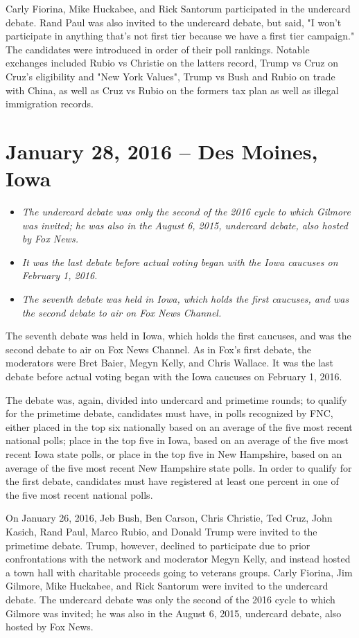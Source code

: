 Carly Fiorina, Mike Huckabee, and Rick Santorum participated in the
undercard debate. Rand Paul was also invited to the undercard debate,
but said, "I won't participate in anything that's not first tier because
we have a first tier campaign." The candidates were introduced in order
of their poll rankings. Notable exchanges included Rubio vs Christie on
the latters record, Trump vs Cruz on Cruz's eligibility and "New York
Values", Trump vs Bush and Rubio on trade with China, as well as Cruz vs
Rubio on the formers tax plan as well as illegal immigration records.

\section{January 28, 2016 -- Des Moines,
Iowa}\label{january-28-2016-des-moines-iowa}

\begin{itemize}
\item
  \emph{The undercard debate was only the second of the 2016 cycle to
  which Gilmore was invited; he was also in the August 6, 2015,
  undercard debate, also hosted by Fox News.}
\item
  \emph{It was the last debate before actual voting began with the Iowa
  caucuses on February 1, 2016.}
\item
  \emph{The seventh debate was held in Iowa, which holds the first
  caucuses, and was the second debate to air on Fox News Channel.}
\end{itemize}

The seventh debate was held in Iowa, which holds the first caucuses, and
was the second debate to air on Fox News Channel. As in Fox's first
debate, the moderators were Bret Baier, Megyn Kelly, and Chris Wallace.
It was the last debate before actual voting began with the Iowa caucuses
on February 1, 2016.

The debate was, again, divided into undercard and primetime rounds; to
qualify for the primetime debate, candidates must have, in polls
recognized by FNC, either placed in the top six nationally based on an
average of the five most recent national polls; place in the top five in
Iowa, based on an average of the five most recent Iowa state polls, or
place in the top five in New Hampshire, based on an average of the five
most recent New Hampshire state polls. In order to qualify for the first
debate, candidates must have registered at least one percent in one of
the five most recent national polls.

On January 26, 2016, Jeb Bush, Ben Carson, Chris Christie, Ted Cruz,
John Kasich, Rand Paul, Marco Rubio, and Donald Trump were invited to
the primetime debate. Trump, however, declined to participate due to
prior confrontations with the network and moderator Megyn Kelly, and
instead hosted a town hall with charitable proceeds going to veterans
groups. Carly Fiorina, Jim Gilmore, Mike Huckabee, and Rick Santorum
were invited to the undercard debate. The undercard debate was only the
second of the 2016 cycle to which Gilmore was invited; he was also in
the August 6, 2015, undercard debate, also hosted by Fox News.

